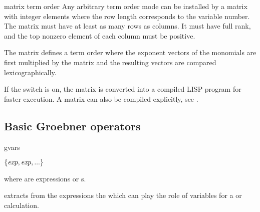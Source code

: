 \begin{Concept}{matrix term order}
Any arbitrary term order mode can be installed by a matrix with
integer elements where the row length corresponds to the variable
number. The matrix must have at least as many rows as columns.
It must have full rank, and the top nonzero element of each column
must be positive.

The matrix 
defines a term order where the exponent vectors of the monomials are
first multiplied by the matrix and the resulting vectors are compared
lexicographically.

If the switch  is on, the matrix is converted into
a compiled LISP program for faster execution. A matrix can also be
compiled explicitly, see .
\end{Concept}
\subsection{Basic Groebner operators}
\begin{Operator}{gvars}
\begin{Syntax}

  \(\{\meta{exp},\meta{exp},... \}\)

\end{Syntax}
 where  are expressions or s.

 extracts from the expressions the  
which can 
play the role of variables for a  or  
calculation. 
\end{Operator}


